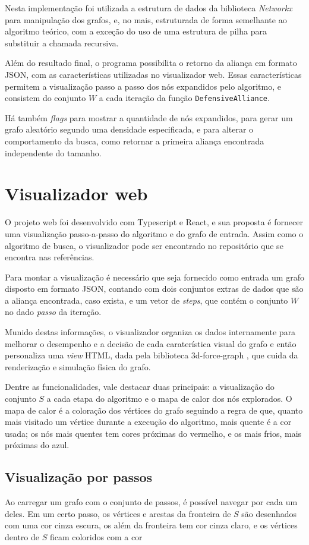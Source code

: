 Nesta implementação foi utilizada a estrutura de dados da biblioteca \textit{Networkx} para manipulação dos grafos, e, no mais, estruturada de forma semelhante ao algoritmo teórico, com a exceção do uso de uma estrutura de pilha para substituir a chamada recursiva.

Além do resultado final, o programa possibilita o retorno da aliança em formato JSON, com as características utilizadas no visualizador web. Essas características permitem a visualização passo a passo dos nós expandidos pelo algoritmo, e consistem do conjunto $W$ a cada iteração da função \texttt{DefensiveAlliance}.

Há também \textit{flags} para mostrar a quantidade de nós expandidos, para gerar um grafo aleatório segundo uma densidade especificada, e para alterar o comportamento da busca, como retornar a primeira aliança encontrada independente do tamanho.

\section{Visualizador web}
O projeto web foi desenvolvido com Typescript e React, e sua proposta é fornecer uma visualização passo-a-passo do algoritmo e do grafo de entrada. Assim como o algoritmo de busca, o visualizador pode ser encontrado no repositório que se encontra nas referências.

Para montar a visualização é necessário que seja fornecido como entrada um grafo disposto em formato JSON, contando com dois conjuntos extras de dados que são a aliança encontrada, caso exista, e um vetor de \textit{steps}, que contém o conjunto $W$ no dado \textit{passo} da iteração.

Munido destas informações, o visualizador organiza os dados internamente para melhorar o desempenho e a decisão de cada caraterística visual do grafo e então personaliza uma \textit{view} HTML, dada pela biblioteca 3d-force-graph \cite{HassanShafique2004}, que cuida da renderização e simulação física do grafo.

Dentre as funcionalidades, vale destacar duas principais: a visualização do conjunto $S$ a cada etapa do algoritmo e o mapa de calor dos nós explorados. O mapa de calor é a coloração dos vértices do grafo seguindo a regra de que, quanto mais visitado um vértice durante a execução do algoritmo, mais quente é a cor usada; os nós mais quentes tem cores próximas do vermelho, e os mais frios, mais próximas do azul.

\subsection{Visualização por passos}
Ao carregar um grafo com o conjunto de passos, é possível navegar por cada um deles. Em um certo passo, os vértices e arestas da fronteira de $S$ são desenhados com uma cor cinza escura, os além da fronteira tem cor cinza claro, e os vértices dentro de $S$ ficam coloridos com a cor

